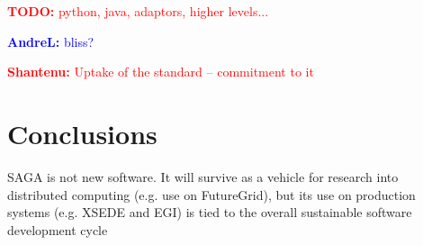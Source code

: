 \documentclass{article}
\newcommand{\B}[1]{\textbf{#1}}
\newcommand{\todo}[1]{{\textcolor{red}{\B{TODO:} #1 }}}
\newcommand{\jhanote}[1]{{\textcolor{red}{     \B{Shantenu:} #1 }}}
\newcommand{\alnote}[1]{{\textcolor{blue}{    \B{AndreL:  } #1 }}}
\newcommand{\hknote}[1]{{\textcolor{red}{  \B{Hartmut: } #1 }}}
\newcommand{\todo}[1]{}
\newcommand{\jhanote}[1]{}
\newcommand{\alnote}[1]{}
\newcommand{\hknote}[1]{}
\begin{document}
  \todo{python, java, adaptors, higher levels...}




  \alnote{bliss?}


  \jhanote{Uptake of the standard -- commitment to it}



\section{Conclusions}
\label{sec:conclusions}

SAGA is not new software. It will survive as a vehicle for research
into distributed computing (e.g. use on FutureGrid), but
its use on production systems (e.g. XSEDE and EGI) is tied to the 
overall sustainable software development cycle
\end{document}
